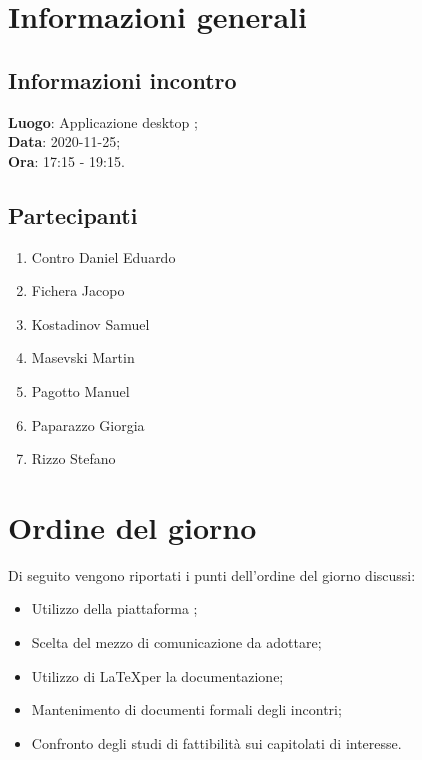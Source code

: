 \documentclass{article}
\begin{document}


\section{Informazioni generali}%
\label{sec:informazioni_generali}

\subsection{Informazioni incontro}%
\label{sub:informazioni_incontro}

\textbf{Luogo}: Applicazione desktop ; \\
\textbf{Data}: 2020-11-25; \\
\textbf{Ora}: 17:15 - 19:15.  

\subsection{Partecipanti}%
\label{sub:partecipanti}

\begin{enumerate}
    \item Contro Daniel Eduardo
    \item Fichera Jacopo
    \item Kostadinov Samuel
    \item Masevski Martin
    \item Pagotto Manuel
    \item Paparazzo Giorgia
    \item Rizzo Stefano
\end{enumerate}

\section{Ordine del giorno}%
\label{sec:ordine_del_giorno}

Di seguito vengono riportati i punti dell'ordine del giorno discussi:
\begin{itemize}
    \item Utilizzo della piattaforma ;
    \item Scelta del mezzo di comunicazione da adottare;
    \item Utilizzo di \LaTeX per la documentazione;
    \item Mantenimento di documenti formali degli incontri;
    \item Confronto degli studi di fattibilità sui capitolati di interesse.
\end{itemize}
\end{document}
